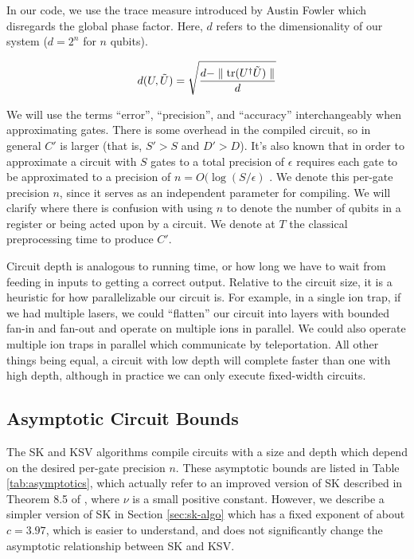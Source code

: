In our code, we use the trace measure introduced by Austin Fowler which disregards
the global phase factor. Here,
$d$ refers to the dimensionality
of our system ($d = 2^n$ for $n$ qubits).

\begin{equation}
d(U,\tilde{U}) = \sqrt{\frac{d - \parallel \mathrm{tr}(U^\dagger \tilde{U}) \parallel}{d}}
\end{equation}

We will use the terms ``error'', ``precision'', and
``accuracy'' interchangeably when approximating gates.
There is some overhead in the compiled circuit, so in
general $C'$ is larger (that is, $S' > S$ and $D' > D$). It's also known that
in order to approximate a circuit with $S$ gates to a total precision of
$\epsilon$
requires each gate to be approximated to a precision of
$n = O(\log(S/\epsilon)$ \cite{Lloyd1995}. We denote this per-gate precision
$n$, since it serves as an independent parameter for compiling. We will clarify
where there is confusion with using $n$ to denote the number of qubits in a
register or being acted upon by a circuit.
We denote at $T$ the classical preprocessing time to
produce $C'$.
 
Circuit depth is analogous to running time, or how long we have to wait from
feeding in inputs to getting a correct output. Relative to the circuit size,
it is a heuristic for how parallelizable our
circuit is. For example, in a single ion trap, if we had multiple lasers,
we could ``flatten'' our circuit into layers with bounded fan-in and
fan-out and operate on multiple ions in parallel.
We could also operate multiple ion traps in parallel which communicate by
teleportation.
All other things being equal, a circuit with low depth will complete
faster than one with high depth, although in practice we can only execute
fixed-width circuits.

\subsection{Asymptotic Circuit Bounds}

The SK and KSV algorithms compile circuits with
a size and depth which depend on the desired per-gate precision $n$.
These asymptotic bounds are listed in
Table \ref{tab:asymptotics}, which actually refer to an improved version of
SK described in Theorem 8.5 of \cite{ksv02}, where 
$\nu$ is a small positive constant.
However, we describe a simpler version of SK in Section \ref{sec:sk-algo}
which has a fixed exponent of about $c=3.97$, which is easier to understand,
and does not significantly change the asymptotic relationship between SK and
KSV.

